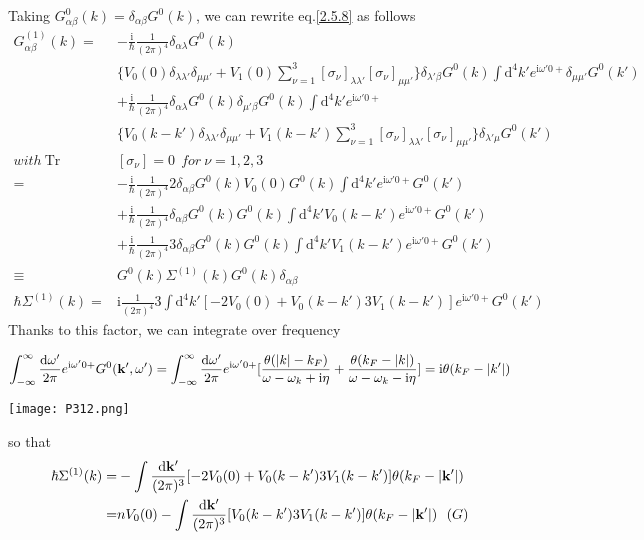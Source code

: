 Taking $G_{\alpha\beta}^0(k)=\delta_{\alpha\beta}G^0(k)$, we can rewrite eq.\ref{2.5.8} as follows  
\begin{align}
G_{\alpha\beta}^{(1)}(k)=&-\frac{\mathrm{i}}{\hbar}\frac{1}{(2\pi)^4}\delta_{\alpha\lambda}G^{0}(k)
\nonumber \\
&\{V_0(0) \delta_{\lambda\lambda'}\delta_{\mu\mu'}+V_1(0)\sum_{\nu=1}^{3}[\sigma_{\nu}]_{\lambda\lambda'}[\sigma_{\nu}]_{\mu\mu'}\}\delta_{\lambda'\beta}G^0(k)\int \mathrm{d}^4k'e^{\mathrm{i}\omega'0+}\delta_{\mu\mu'}G^0(k')\nonumber \\
&+\frac{\mathrm{i}}{\hbar}\frac{1}{(2\pi)^4}\delta_{\alpha\lambda}G^0(k)\delta_{\mu'\beta}G^0(k)\int \mathrm{d}^4k'e^{\mathrm{i}\omega'0+}\nonumber\\
&\{V_0(k-k') \delta_{\lambda\lambda'}\delta_{\mu\mu'}+V_1(k-k')\sum_{\nu=1}^{3}[\sigma_{\nu}]_{\lambda\lambda'}[\sigma_{\nu}]_{\mu\mu'}\}\delta_{\lambda'\mu}G^0(k') \nonumber \\
with\ \mathrm{Tr}&[\sigma_{\nu}]=0\ \ for \ \nu=1,2,3 \nonumber \\
=&-\frac{\mathrm{i}}{\hbar}\frac{1}{(2\pi)^4}2\delta_{\alpha\beta}G^{0}(k)V_0(0)G^0(k)\int \mathrm{d}^4k'e^{\mathrm{i}\omega'0+}G^0(k')\nonumber \\
&+\frac{\mathrm{i}}{\hbar}\frac{1}{(2\pi)^4}\delta_{\alpha\beta}G^{0}(k)G^0(k)\int \mathrm{d}^4k'V_0(k-k')e^{\mathrm{i}\omega'0+}G^0(k')\nonumber \\
&+\frac{\mathrm{i}}{\hbar}\frac{1}{(2\pi)^4}3\delta_{\alpha\beta}G^{0}(k)G^0(k)\int \mathrm{d}^4k'V_1(k-k')e^{\mathrm{i}\omega'0+}G^0(k')\nonumber \\
\equiv& G^{0}(k)\Sigma^{(1)}(k)G^0(k)\delta_{\alpha\beta} \nonumber \\
\hbar \Sigma^{(1)}(k)=& \mathrm{i}\frac{1}{(2\pi)^4}3\int \mathrm{d}^4k'[-2V_0(0)+V_0(k-k')3V_1(k-k')]e^{\mathrm{i}\omega'0+}G^0(k') \nonumber
\end{align}
Thanks to this factor, we can integrate over frequency

\begin{align}
\int_{-\infty}^{\infty}\frac{\mathrm{d}\omega'}{2\pi}e^{\mathrm{i}\omega'0+}G^0({\bf k}',\omega')=\int_{-\infty}^{\infty}\frac{\mathrm{d}\omega'}{2\pi}e^{\mathrm{i}\omega'0+}[\frac{\theta(|k|-k_F)}{\omega-\omega_k+\mathrm{i}\eta}+\frac{\theta(k_F-|k|)}{\omega-\omega_k-\mathrm{i}\eta}]=\mathrm{i}\theta(k_F-|k'|) \nonumber
\end{align}
\begin{center}
\texttt{[image: P312.png]}
\end{center}
so that
\begin{align}\label{2.5.9}
\hbar \Sigma^{(1)}(k)=&-\int \frac{\mathrm{d}{\bf k}'}{(2\pi)^3}[-2V_0(0)+V_0(k-k')3V_1(k-k')]\theta(k_F-|{\bf k}'|) \nonumber \\
=& n V_0(0)-\int \frac{\mathrm{d}{\bf k}'}{(2\pi)^3}[V_0(k-k')3V_1(k-k')]\theta(k_F-|{\bf k}'|) \ \ (G) 
\end{align}

